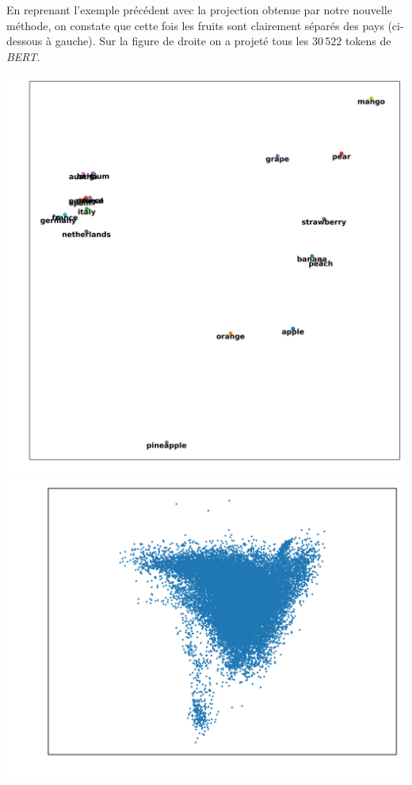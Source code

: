 \documentclass[11pt,class=report,crop=false]{standalone}
\begin{document}
\begin{exemple}
En reprenant l'exemple précédent avec la projection obtenue par notre nouvelle méthode, on constate que cette fois les fruits sont clairement séparés des pays (ci-dessous à gauche). Sur la figure de droite on a projeté tous les $30\,522$ tokens de \emph{BERT}. 
\begin{center}
	\includegraphics[scale=\myscale,scale=0.3]{figures/projection-pca-1}
	\includegraphics[scale=\myscale,scale=0.5]{figures/projection-pca-4}
\end{center}
\end{exemple}
\end{document}
